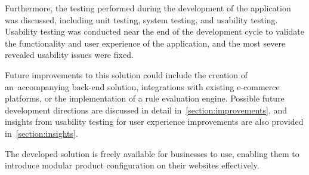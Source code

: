 Furthermore, the testing performed during the development of the application was discussed, including unit testing, system testing, and usability testing. Usability testing was conducted near the end of the development cycle to validate the functionality and user experience of the application, and the most severe revealed usability issues were fixed.

Future improvements to this solution could include the creation of an~accompanying back-end solution, integrations with existing e-commerce platforms, or the implementation of a rule evaluation engine. Possible future development directions are discussed in detail in~\autoref{section:improvements}, and insights from usability testing for user experience improvements are also provided in~\autoref{section:insights}.

The developed solution is freely available for businesses to use, enabling them to introduce modular product configuration on their websites effectively.